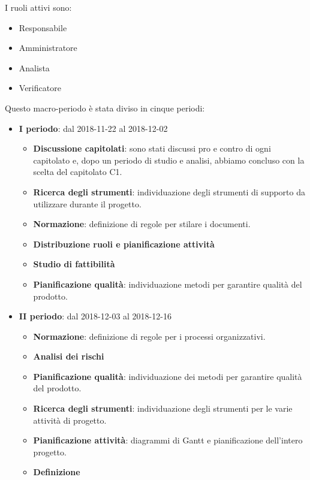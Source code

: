         I ruoli attivi sono:
        \begin{itemize}
            \item Responsabile
            \item Amministratore
            \item Analista
            \item Verificatore
        \end{itemize}
        Questo macro-periodo è stata diviso in cinque periodi:
		\begin{itemize}
			\item \textbf{I periodo}: dal 2018-11-22 al 2018-12-02
			\begin{itemize}
    	        \item \textbf{Discussione capitolati}: sono stati discussi pro e contro di ogni capitolato e, dopo un periodo di
				studio e analisi, abbiamo concluso con la scelta del capitolato C1.
    	        \item \textbf{Ricerca degli strumenti}: individuazione degli strumenti di supporto da utilizzare durante il progetto.
    	        \item \textbf{Normazione}: definizione di regole per stilare i documenti.
    	        \item \textbf{Distribuzione ruoli e pianificazione attività}
       	        \item \textbf{Studio di fattibilità}
       	        \item \textbf{Pianificazione qualità}: individuazione metodi per garantire qualità del prodotto.
			\end{itemize}
			\newpage
			\item \textbf{II periodo}: dal 2018-12-03 al 2018-12-16
			\begin{itemize}
    	        \item \textbf{Normazione}: definizione di regole per i processi organizzativi.
    	        \item \textbf{Analisi dei rischi}
    	        \item \textbf{Pianificazione qualità}: individuazione dei metodi per garantire qualità del prodotto.
       	        \item \textbf{Ricerca degli strumenti}: individuazione degli strumenti per le varie attività di progetto.
       	        \item \textbf{Pianificazione attività}: diagrammi di Gantt e pianificazione dell'intero progetto.
       	        \item \textbf{Definizione }

\end{itemize}
\end{itemize}
